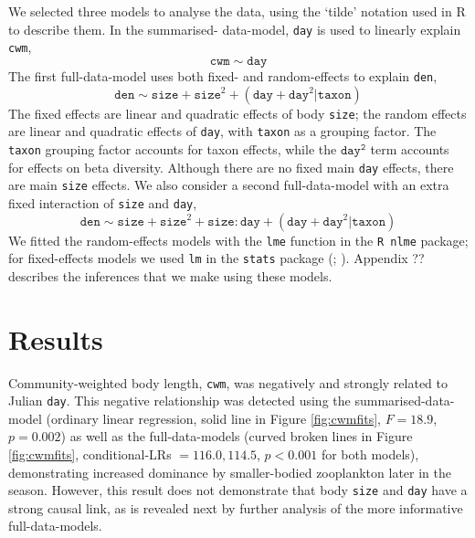 \documentclass[12pt]{ecology}
\begin{document}
We selected three models to analyse the data, using the \citet{WilkinsonAndRogers1973} `tilde' notation used in R to describe them.  In the summarised- data-model, \texttt{day} is used to linearly explain \texttt{cwm},
\begin{equation}
\mathtt{cwm} \sim \mathtt{day}
\label{eq:sdm}
\end{equation}
The first full-data-model uses both fixed- and random-effects to explain \texttt{den},
\begin{equation}
\mathtt{den} \sim \mathtt{size} + \mathtt{size}^2 + (\mathtt{day} + \mathtt{day}^2 | \mathtt{taxon})
\label{eq:fdmnointeraction}
\end{equation}
The fixed effects are linear and quadratic effects of body \texttt{size}; the random effects are linear and quadratic effects of \texttt{day}, with \texttt{taxon} as a grouping factor.  The \texttt{taxon} grouping factor accounts for taxon effects, while the $\mathtt{day^2}$ term accounts for effects on beta diversity.  Although there are no fixed main \texttt{day} effects, there are main \texttt{size} effects.  We also consider a second full-data-model with an extra fixed interaction of \texttt{size} and \texttt{day},
\begin{equation}
\mathtt{den} \sim \mathtt{size} + \mathtt{size}^2 + \mathtt{size:day} + (\mathtt{day} + \mathtt{day}^2 | \mathtt{taxon})
\label{eq:fdminteraction}
\end{equation}
We fitted the random-effects models with the \texttt{lme} function in the \texttt{R nlme} package; for fixed-effects models we used \texttt{lm} in the \texttt{stats} package (; ).  Appendix ?? describes the inferences that we make using these models.

\section{Results}

Community-weighted body length, \texttt{cwm}, was negatively and strongly related to Julian \texttt{day}.  This negative relationship was detected using the summarised-data-model (ordinary linear regression, solid line in Figure \ref{fig:cwmfits}, $F = 18.9$, $p = 0.002$) as well as the full-data-models (curved broken lines in Figure \ref{fig:cwmfits}, conditional-LRs $= 116.0, 114.5$, $p < 0.001$ for both models), demonstrating increased dominance by smaller-bodied zooplankton later in the season.  However, this result does not demonstrate that body \texttt{size} and \texttt{day} have a strong causal link, as is revealed next by further analysis of the more informative full-data-models.
\end{document}
